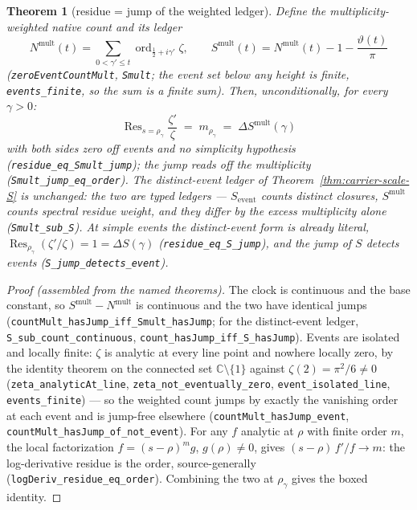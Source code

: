 \documentclass[11pt]{article}
\newtheorem{theorem}{Theorem}
\theoremstyle{definition}
\begin{document}
\begin{theorem}[residue = jump of the weighted ledger]\label{thm:residue-jump}
Define the multiplicity-weighted native count and its ledger
\[
N^{\mathrm{mult}}(t)=\sum_{0<\gamma'\le t}\operatorname{ord}_{\frac12+i\gamma'}\zeta,
\qquad
S^{\mathrm{mult}}(t)=N^{\mathrm{mult}}(t)-1-\frac{\vartheta(t)}{\pi}
\]
(\texttt{zeroEventCountMult}, \texttt{Smult}; the event set below any height is
finite, \texttt{events\_finite}, so the sum is a finite sum).  Then,
unconditionally, for every \(\gamma>0\):
\[
\boxed{\;
\operatorname{Res}_{s=\rho_\gamma}\frac{\zeta'}{\zeta}
\;=\;
m_{\rho_\gamma}
\;=\;
\Delta S^{\mathrm{mult}}(\gamma)
\;}
\]
with both sides zero off events and no simplicity hypothesis
(\texttt{residue\_eq\_Smult\_jump}); the jump reads off the multiplicity
(\texttt{Smult\_jump\_eq\_order}).  The distinct-event ledger of
Theorem~\ref{thm:carrier-scale-S} is unchanged: the two are typed ledgers ---
\(S_{\mathrm{event}}\) counts distinct closures, \(S^{\mathrm{mult}}\) counts
spectral residue weight, and they differ by the excess multiplicity alone
(\texttt{Smult\_sub\_S}).  At simple events the distinct-event form is already
literal, \(\operatorname{Res}_{\rho_\gamma}(\zeta'/\zeta)=1=\Delta S(\gamma)\)
(\texttt{residue\_eq\_S\_jump}), and the jump of \(S\) detects events
(\texttt{S\_jump\_detects\_event}).
\end{theorem}

\begin{proof}[Proof (assembled from the named theorems)]
The clock is continuous and the base constant, so
\(S^{\mathrm{mult}}-N^{\mathrm{mult}}\) is continuous and the two have
identical jumps (\texttt{countMult\_hasJump\_iff\_Smult\_hasJump}; for the
distinct-event ledger, \texttt{S\_sub\_count\_continuous},
\texttt{count\_hasJump\_iff\_S\_hasJump}).  Events are isolated and locally
finite: \(\zeta\) is analytic at every line point and nowhere locally zero, by
the identity theorem on the connected set \(\mathbb C\setminus\{1\}\) against
\(\zeta(2)=\pi^2/6\neq0\) (\texttt{zeta\_analyticAt\_line},
\texttt{zeta\_not\_eventually\_zero}, \texttt{event\_isolated\_line},
\texttt{events\_finite}) --- so the weighted count jumps by exactly the
vanishing order at each event and is jump-free elsewhere
(\texttt{countMult\_hasJump\_event},
\texttt{countMult\_hasJump\_of\_not\_event}).  For any \(f\) analytic at
\(\rho\) with finite order \(m\), the local factorization
\(f=(s-\rho)^m g\), \(g(\rho)\neq0\), gives \((s-\rho)\,f'/f\to m\): the
log-derivative residue is the order, source-generally
(\texttt{logDeriv\_residue\_eq\_order}).  Combining the two at \(\rho_\gamma\)
gives the boxed identity.
\end{proof}
\end{document}
